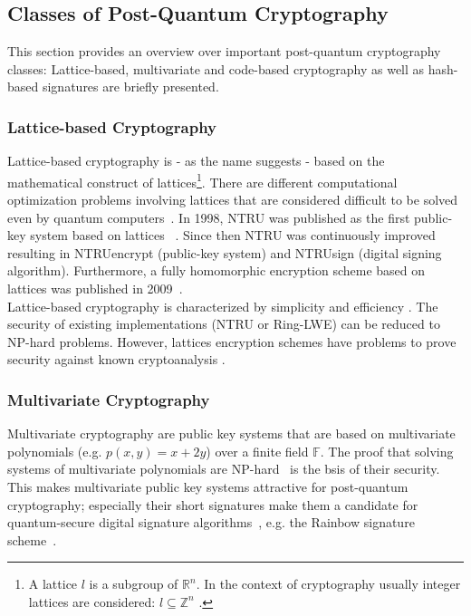 \subsection{Classes of Post-Quantum Cryptography} \label{sec:classes_pqc}

This section provides an overview over important post-quantum cryptography classes: Lattice-based, multivariate and code-based cryptography as well as hash-based signatures are briefly presented. 

\subsubsection{Lattice-based Cryptography}
Lattice-based cryptography is - as the name suggests - based on the mathematical construct of lattices\footnote{A lattice $l$ is a subgroup of $\mathbb{R}^n$. In the context of cryptography usually integer lattices are considered: $l \subseteq \mathbb{Z}^n$ \parencite{chi2015lattice}.}. There are different computational optimization problems involving lattices that are considered difficult to be solved even by quantum computers~\parencite{chi2015lattice}. In 1998, NTRU was published as the first public-key system based on lattices ~\parencite{hoffstein1998ntru}. Since then NTRU was continuously improved resulting in NTRUencrypt (public-key system) and NTRUsign (digital signing algorithm). Furthermore, a fully homomorphic encryption scheme based on lattices was published in 2009~\parencite{gentry2009fully}.\\
Lattice-based cryptography is characterized by simplicity and efficiency \parencite{chen2016report}. The security of existing implementations (NTRU or Ring-LWE) can be reduced to NP-hard problems. However, lattices encryption schemes have problems to prove security against known cryptoanalysis \parencite{chen2016report}.
\subsubsection{Multivariate Cryptography}
Multivariate cryptography are public key systems that are based on multivariate polynomials (e.g. $p(x,y)=x+2y$) over a finite field $\mathbb{F}$. The proof that solving systems of multivariate polynomials are NP-hard~\parencite{hartmanis1982computers} is the bsis of their security. This makes multivariate public key systems attractive for post-quantum cryptography; especially their short signatures make them a candidate for quantum-secure digital signature algorithms~\parencite{ding2017current}, e.g. the Rainbow signature scheme~\parencite{ding2005rainbow}.
